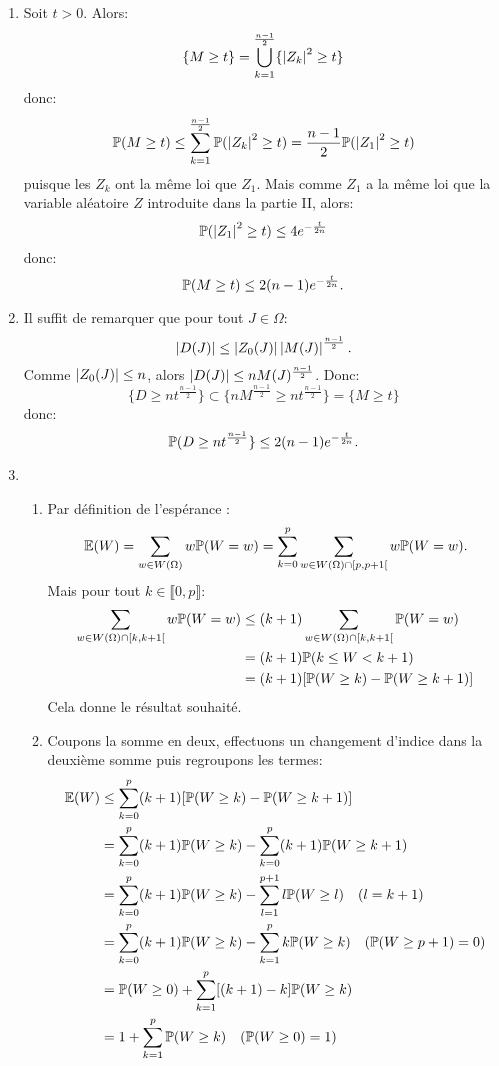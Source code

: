 \begin{enumerate}
\item Soit $t > 0$. Alors:
\[ \{ M \geq t \} = \bigcup_{k=1}^{\frac{n-1}{2}} \{ \left\vert Z_{k}\right\vert^{2} \geq t\}\]
donc:
\[ \mathbb{P}(M\geq t) \leq \sum_{k=1}^{\frac{n-1}{2}}\mathbb{P}(\left\vert Z_{k}\right\vert^{2} \geq t) = \frac{n-1}{2}\mathbb{P}(\left\vert Z_{1}\right\vert^{2}\geq t)\]
puisque les $Z_{k}$ ont la même loi que $Z_{1}$. Mais comme $Z_{1}$ a la même loi que la variable aléatoire $Z$ introduite dans la partie II, alors:
\[ \mathbb{P}(\left\vert Z_{1}\right\vert^{2}\geq t) \leq 4e^{-\frac{t}{2n}}
\]
donc:
\[ \mathbb{P}(M\geq t) \leq 2(n-1)e^{-\frac{t}{2n}}.\]

\item Il suffit de remarquer que pour tout $J\in \Omega$:
\[ \left\vert D(J)\right\vert \leq \left\vert Z_{0}(J)\right\vert \left\vert M(J)\right\vert^{\frac{n-1}{2}}.\]
Comme $\left\vert Z_{0}(J)\right\vert \leq n$, alors $\left\vert D(J)\right\vert \leq nM(J)^{\frac{n-1}{2}}$. Donc:
\[ \{ D \geq nt^{\frac{n-1}{2}} \}  \subset \{ nM^{\frac{n-1}{2}} \geq nt^{\frac{n-1}{2}}\} = \{ M\geq t\}\]
donc:
\[ \mathbb{P}(D\geq nt^{\frac{n-1}{2}} \} \leq 2(n-1)e^{-\frac{t}{2n}}.\]

\item \begin{enumerate}
           \item Par définition de l'espérance :
           \[ \mathbb{E}(W) = \sum_{w\in W(\Omega)}w\mathbb{P}(W = w) = \sum_{k=0}^{p}\sum_{w\in W(\Omega)\cap [p, p+1[}w\mathbb{P}(W = w).\]
           Mais pour tout $k\in \llbracket 0, p\rrbracket$:
           \begin{align}
             \sum_{w\in W(\Omega)\cap [k, k+1[}w\mathbb{P}(W = w) & \leq (k+1)\sum_{w\in W(\Omega)\cap [k, k+1[}\mathbb{P}(W = w) \notag\\
             & = (k+1)\mathbb{P}(k\leq W < k+1) \notag\\
             & = (k+1)[\mathbb{P}(W\geq k) - \mathbb{P}(W\geq k+1)]\notag
           \end{align}
           Cela donne le résultat souhaité.
           \item Coupons la somme en deux, effectuons un changement d'indice dans la deuxième somme puis regroupons les termes:
           \begin{align}
          \mathbb{E}(W) & \leq \sum_{k=0}^{p}(k+1)[\mathbb{P}(W\geq k) - \mathbb{P}(W\geq k+1)]\notag\\
          & = \sum_{k=0}^{p}(k+1)\mathbb{P}(W\geq k) - \sum_{k=0}^{p}(k+1)\mathbb{P}(W\geq k+1)\notag\\
          & = \sum_{k=0}^{p}(k+1)\mathbb{P}(W\geq k) - \sum_{l=1}^{p+1}l\mathbb{P}(W\geq l) \quad (l = k+1)\notag\\
          & = \sum_{k=0}^{p}(k+1)\mathbb{P}(W\geq k) - \sum_{k=1}^{p}k\mathbb{P}(W\geq k) \quad (\mathbb{P}(W\geq p+1) = 0)\notag\\
          & = \mathbb{P}(W\geq 0) + \sum_{k=1}^{p}[(k+1) - k]\mathbb{P}(W\geq k)\notag\\
          & = 1 + \sum_{k=1}^{p}\mathbb{P}(W\geq k) \quad (\mathbb{P}(W\geq 0) = 1)\notag
           \end{align}
          \end{enumerate}


\end{enumerate}
